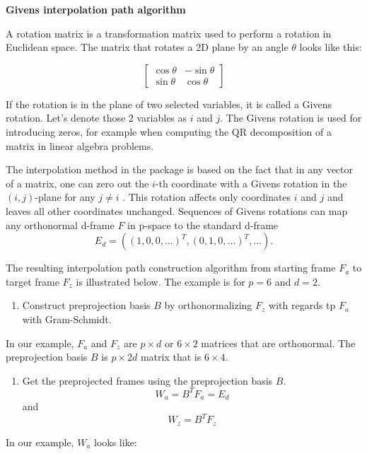 \textbf{Givens interpolation path algorithm}

A rotation matrix is a transformation matrix used to perform a rotation
in Euclidean space. The matrix that rotates a 2D plane by an angle
\(\theta\) looks like this:

\[ \begin{bmatrix}\cos \theta &-\sin \theta \\\sin \theta &\cos \theta \end{bmatrix} \]

If the rotation is in the plane of two selected variables, it is called
a Givens rotation. Let's denote those 2 variables as \(i\) and \(j\).
The Givens rotation is used for introducing zeros, for example when
computing the QR decomposition of a matrix in linear algebra problems.

The interpolation method in the  package is based on
the fact that in any vector of a matrix, one can zero out the \(i\)-th
coordinate with a Givens rotation in the \((i, j)\)-plane for any
\(j\neq i\) \citep{matrix_computation}. This rotation affects only
coordinates \(i\) and \(j\) and leaves all other coordinates unchanged.
Sequences of Givens rotations can map any orthonormal d-frame \(F\) in
p-space to the standard d-frame
\[E_d=((1, 0, 0, ...)^T, (0, 1, 0, ...)^T, ...).\]

The resulting interpolation path construction algorithm from starting
frame \(F_a\) to target frame \(F_z\) is illustrated below. The example
is for \(p=6\) and \(d=2\).

\begin{enumerate}
\def\labelenumi{\arabic{enumi}.}
\tightlist
\item
  Construct preprojection basis \(B\) by orthonormalizing \(F_z\) with
  regards tp \(F_a\) with Gram-Schmidt.
\end{enumerate}

In our example, \(F_a\) and \(F_z\) are \(p\times d\) or \(6\times2\)
matrices that are orthonormal. The preprojection basis \(B\) is
\(p\times 2d\) matrix that is \(6\times 4\).

\begin{enumerate}
\def\labelenumi{\arabic{enumi}.}
\setcounter{enumi}{1}
\tightlist
\item
  Get the preprojected frames using the preprojection basis \(B\).
  \[W_a = B^TF_a = E_d\] and \[W_z = B^TF_z\]
\end{enumerate}

In our example, \(W_a\) looks like:

